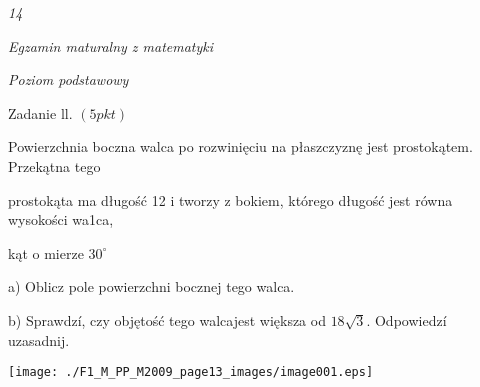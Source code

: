 \documentclass[a4paper,12pt]{article}
\begin{document}
{\it 14}

{\it Egzamin maturalny z matematyki}

{\it Poziom podstawowy}

Zadanie ll. $(5pkt)$

Powierzchnia boczna walca po rozwinięciu na płaszczyznę jest prostokątem. Przekątna tego

prostokąta ma długość 12 i tworzy z bokiem, którego długość jest równa wysokości wa1ca,

kąt o mierze $30^{\circ}$

a) Oblicz pole powierzchni bocznej tego walca.

b) Sprawdzí, czy objętość tego walcajest większa od $18\sqrt{3}$. Odpowiedzí uzasadnij.
\begin{center}
\texttt{[image: ./F1\_M\_PP\_M2009\_page13\_images/image001.eps]}
\end{center}
\end{document}
